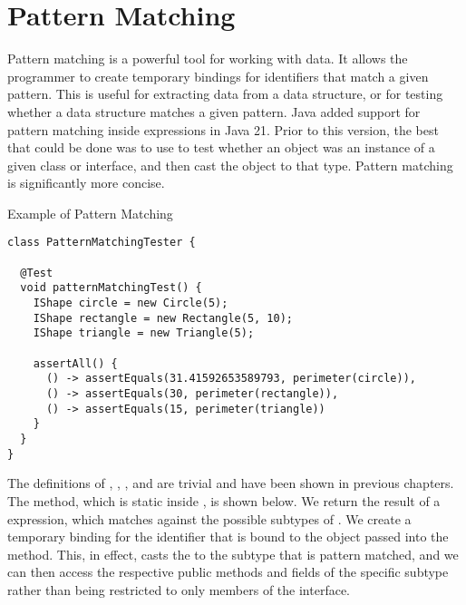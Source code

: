 \section{Pattern Matching}

Pattern matching is a powerful tool for working with data. It allows the programmer to create temporary bindings for identifiers that match a given pattern. This is useful for extracting data from a data structure, or for testing whether a data structure matches a given pattern. Java added support for pattern matching inside  expressions in Java 21. Prior to this version, the best that could be done was to use  to test whether an object was an instance of a given class or interface, and then cast the object to that type. Pattern matching is significantly more concise.


\begin{cl}{Example of Pattern Matching}
\begin{lstlisting}[language=MyJava]
class PatternMatchingTester {

  @Test
  void patternMatchingTest() {
    IShape circle = new Circle(5);
    IShape rectangle = new Rectangle(5, 10);
    IShape triangle = new Triangle(5);

    assertAll() {
      () -> assertEquals(31.41592653589793, perimeter(circle)),
      () -> assertEquals(30, perimeter(rectangle)),
      () -> assertEquals(15, perimeter(triangle))
    }
  }
}
\end{lstlisting}
\end{cl}

The definitions of , , , and  are trivial and have been shown in previous chapters. The  method, which is static inside , is shown below. We return the result of a  expression, which matches against the possible subtypes of . We create a temporary binding for the identifier  that is bound to the  object passed into the method. This, in effect, casts the  to the subtype that is pattern matched, and we can then access the respective public methods and fields of the specific subtype rather than being restricted to only members of the  interface.

